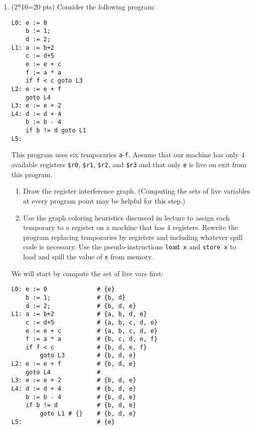 \documentclass[10pt]{article}
\begin{document}
\begin{enumerate}
\pagebreak

\item (2*10=20 pts) Consider the following program:

\begin{verbatim}
L0: e := 0
    b := 1;
    d := 2;
L1: a := b+2
    c := d+5
    e := e + c
    f := a * a
    if f < c goto L3
L2: e := e + f
    goto L4
L3: e := e + 2
L4: d := d + 4
    b := b - 4
    if b != d goto L1
L5:
\end{verbatim}

This program uses six temporaries \texttt{a}-\texttt{f}.  Assume that
our machine has only 4 available registers \texttt{\$r0},
\texttt{\$r1}, \texttt{\$r2}, and \texttt{\$r3}
and that only
\texttt{e} is live on exit from this program.

\begin{enumerate}
\item Draw the register interference graph.  (Computing the sets of
live variables at every program point may be helpful for this step.)

\item Use the graph coloring heuristics discussed in lecture to assign
  each temporary to a register on a machine that has $4$ registers.
Rewrite the program replacing temporaries by registers and including whatever
spill code is necessary.  Use the pseudo-instructions \texttt{load x}
and \texttt{store x} to load and spill the value of \texttt{x} from
memory.
\end{enumerate}

We will start by compute the set of live vars first:

\begin{lstlisting}[tabsize=4]
L0: e := 0 				# {e}		 
    b := 1;				# {b, d}		
    d := 2;				# {b, d, e}		
L1: a := b+2			# {a, b, d, e}		
    c := d+5			# {a, b, c, d, e}		
    e := e + c 			# {a, b, c, d, e}		
    f := a * a 			# {b, c, d, e, f}		
    if f < c 			# {b, d, e, f}		
    	goto L3			# {b, d, e}		
L2: e := e + f 			# {b, d, e}		
    goto L4				# 
L3: e := e + 2			# {b, d, e}		
L4: d := d + 4			# {b, d, e}		
    b := b - 4			# {b, d, e}		
    if b != d 			# {b, d, e} 
    	goto L1	# {}	# {b, d, e}
L5:						# {e}
\end{lstlisting}

\begin{center}\end{center}



\end{enumerate}
\end{document}
